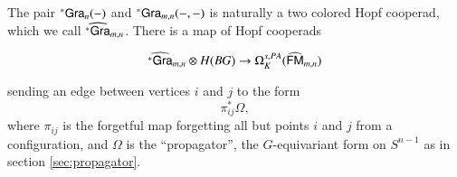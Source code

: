 \documentclass[a4paper]{amsart}
\theoremstyle{plain}
\theoremstyle{definition}
\newcommand{\R}{{\mathbb{R}}}
\newcommand{\FM}{\mathsf{FM}}
\newcommand{\SO}{\mathit{SO}}
\newcommand{\beq}[1]{
\begin{equation}\label{#1}
}
\newcommand{\eeq}{
\end{equation}
}
\begin{document}
The pair ${}^*{\mathsf{Gra}}_n(-)$ and ${}^*{\mathsf{Gra}}_{m,n}(-,-)$ is naturally a two colored Hopf cooperad, which we call $\widehat{{}^*{\mathsf{Gra}}}_{m,n}$.
There is a map of Hopf cooperads
\beq{equ:sthGramap}
\sthGra_{m,n}\otimes H(BG) \to \Omega_K^{s,PA} (\hFM_{m,n})
\eeq
sending an edge between vertices $i$ and $j$ to the form 
\[
\pi_{ij}^* \Omega, 
\]
where $\pi_{ij}$ is the forgetful map forgetting all but points $i$ and $j$ from a configuration, and $\Omega$ is the ``propagator'', the $G$-equivariant form on $S^{n-1}$ as in section \ref{sec:propagator}.

%
\end{document}
